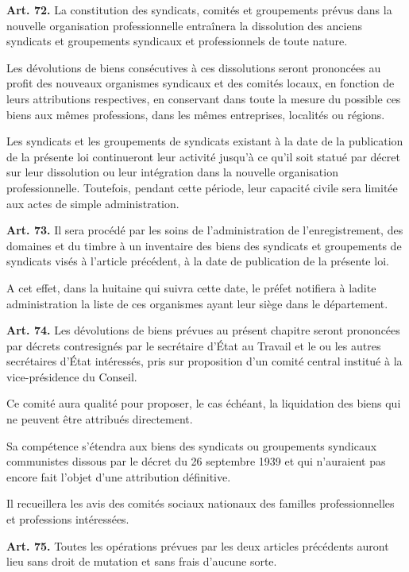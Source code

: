 \documentclass[french,twoside]{book} %
\newcommand{\labelchar}[1]{\textbf{\color{rubric} #1}}
\begin{document}
\bigbreak
\noindent \labelchar{Art. 72.} La constitution des syndicats, comités et groupements prévus dans la nouvelle organisation professionnelle entraînera la dissolution des anciens syndicats et groupements syndicaux et professionnels de toute nature.\par
Les dévolutions de biens consécutives à ces dissolutions seront prononcées au profit des nouveaux organismes syndicaux et des comités locaux, en fonction de leurs attributions respectives, en conservant dans toute la mesure du possible ces biens aux mêmes professions, dans les mêmes entreprises, localités ou régions.\par
Les syndicats et les groupements de syndicats existant à la date de la publication de la présente loi continueront leur activité jusqu’à ce qu’il soit statué par décret sur leur dissolution ou leur intégration dans la nouvelle organisation professionnelle. Toutefois, pendant cette période, leur capacité civile sera limitée aux actes de simple administration.\par
\bigbreak
\noindent \labelchar{Art. 73.} Il sera procédé par les soins de l’administration de l’enregistrement, des domaines et du timbre à un inventaire des biens des syndicats et groupements de syndicats visés à l’article précédent, à la date de publication de la présente loi.\par
A cet effet, dans la huitaine qui suivra cette date, le préfet notifiera à ladite administration la liste de ces organismes ayant leur siège dans le département.\par
\bigbreak
\noindent \labelchar{Art. 74.} Les dévolutions de biens prévues au présent chapitre seront prononcées par décrets contresignés par le secrétaire d’État au Travail et le ou les autres secrétaires d’État intéressés, pris sur proposition d’un comité central institué à la vice-présidence du Conseil.\par
Ce comité aura qualité pour proposer, le cas échéant, la liquidation des biens qui ne peuvent être attribués directement.\par
Sa compétence s’étendra aux biens des syndicats ou groupements syndicaux communistes dissous par le décret du 26 septembre 1939 et qui n’auraient pas encore fait l’objet d’une attribution définitive.\par
Il recueillera les avis des comités sociaux nationaux des familles professionnelles et professions intéressées.\par
\bigbreak
\noindent \labelchar{Art. 75.} Toutes les opérations prévues par les deux articles précédents auront lieu sans droit de mutation et sans frais d’aucune sorte.\par
\end{document}
